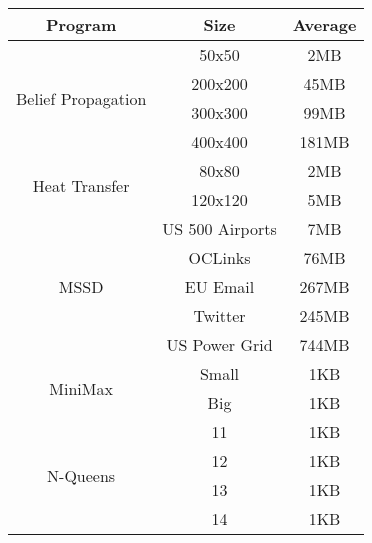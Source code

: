 \begin{tabular}{c | c | c } \hline
	\textbf{Program} & \textbf{Size} & \textbf{Average} \\ \hline \hline
	\multirow{4}{*}{Belief Propagation}  & 50x50 & 2MB\\
		 & 200x200 & 45MB\\
		 & 300x300 & 99MB\\
		 & 400x400 & 181MB\\
	\hline
	\multirow{2}{*}{Heat Transfer}  & 80x80 & 2MB\\
		 & 120x120 & 5MB\\
	\hline
	\multirow{5}{*}{MSSD}  & US 500 Airports & 7MB\\
		 & OCLinks & 76MB\\
		 & EU Email & 267MB\\
		 & Twitter & 245MB\\
		 & US Power Grid & 744MB\\
	\hline
	\multirow{2}{*}{MiniMax}  & Small & 1KB\\
		 & Big & 1KB\\
	\hline
	\multirow{4}{*}{N-Queens}  & 11 & 1KB\\
		 & 12 & 1KB\\
		 & 13 & 1KB\\
		 & 14 & 1KB\\
	\hline
\end{tabular}
